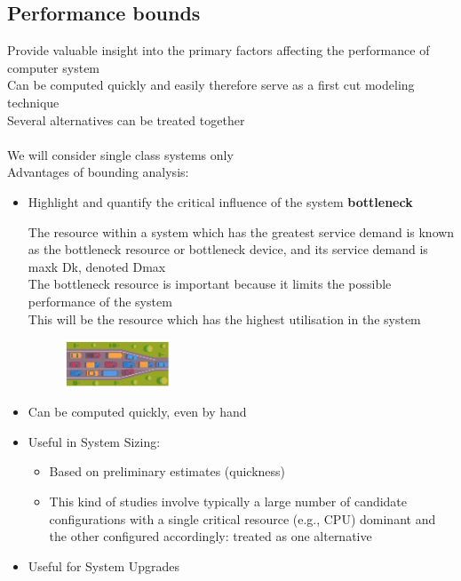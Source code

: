 \documentclass[10pt, oneside]{article}
\begin{document}
\subsection{Performance bounds}
Provide valuable insight into the primary factors affecting the performance of computer system\\Can be computed quickly and easily therefore serve as a first cut modeling technique\\Several alternatives can be treated together\\\\
We will consider single class systems only\\Advantages of bounding analysis:\begin{itemize}
    \item Highlight and quantify the critical influence of the system {\bf bottleneck}\\\begin{multicols}{2}
        The resource within a system which has the greatest service demand is known as the bottleneck resource or bottleneck device, and its service demand is maxk {Dk}, denoted Dmax\\The bottleneck resource is important because it limits the possible performance of the system\\This will be the resource which has the highest utilisation in the system
        \columnbreak
        \begin{figure}[H]
            \begin{center}
                \includegraphics[width=0.3\textwidth]{img/img114.png}
                \end{center}
        \end{figure}
    \end{multicols}
    \item Can be computed quickly, even by hand
    \item Useful in System Sizing:\begin{itemize}
        \item Based on preliminary estimates (quickness)
        \item This kind of studies involve typically a large number of candidate configurations with a single critical resource (e.g., CPU) dominant and the other configured accordingly: treated as one alternative
    \end{itemize}
    \item Useful for System Upgrades
\end{itemize} 
 
 

\end{document}
